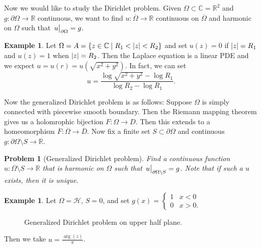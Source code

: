 \documentclass[leqno, openany]{memoir}
\newtheorem{prob}[thm]{Problem}
\theoremstyle{definition}
\newtheorem{exm}[thm]{Example}
\theoremstyle{remark}
\theoremstyle{plain}
\theoremstyle{definition}
\theoremstyle{remark}
\newcommand{\R}{\mathbb{R}}
\newcommand{\C}{\mathbb{C}}
\newcommand{\mc}[1]{\mathcal{#1}}
\newcommand{\ol}[1]{\overline{#1}}
\begin{document}
Now we would like to study the Dirichlet problem. Given $\Omega \subset \C =
\R^2$ and $g \colon \partial \Omega \to \R$ continuous, we want to find $u
\colon \ol{\Omega} \to \R$ continuous on $\ol{\Omega}$ and harmonic on $\Omega$
such that $\eval{u}_{\partial \Omega} = g$.

\begin{exm} Let $\Omega = A = \qty{z \in \C \mid R_1 < \abs{z} < R_2}$ and set
    $u(z) = 0$ if $\abs{z} = R_1$ and $u(z) = 1$ when $\abs{z} = R_2$. Then the
    Laplace equation is a linear PDE and we expect $u = u(r) =
    u(\sqrt{x^2+y^2})$. In fact, we can set \[ u = \frac{\log \sqrt{x^2 + y^2}
    - \log R_1}{\log R_2 - \log R_1}. \] \end{exm}

Now the generalized Dirichlet problem is as follows: Suppose $\Omega$ is simply
connected with piecewise smooth boundary. Then the Riemann mapping theorem
gives us a holomrophic bijection $F \colon \Omega \to D$. Then this extends to
a homeomorphism $\ol{F} \colon \ol{\Omega} \to \ol{D}$. Now fix a finite set $S
\subset \partial \Omega$ and continuous $g \colon \partial \Omega \setminus S
\to \R$. 

\begin{prob}[Generalized Dirichlet problem] Find a continuous function $u
    \colon \ol{\Omega} \setminus S \to \R$ that is harmonic on $\Omega$ such
    that $\eval{u}_{\partial \Omega \setminus S} = g$. Note that if such a $u$
    exists, then it is unique.  \end{prob}

\begin{exm} Let $\Omega = \mc{H}$, $S = 0$, and set $g(x) = \begin{cases} 1 & x
    < 0 \\ 0 & x > 0.  \end{cases}$ \begin{figure}[H] \begin{center}
     \end{center} \caption{Generalized Dirichlet problem on
    upper half plane.}%
\end{figure} Then we take $u = \frac{\arg(z)}{\pi}$.  \end{exm}
\end{document}

